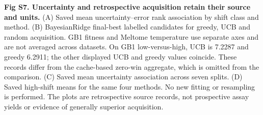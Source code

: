 \caption{{\bf Fig S7. Uncertainty and retrospective acquisition retain their source and units.} (A) Saved mean uncertainty--error rank association by shift class and method. (B) BayesianRidge final-best labelled candidates for greedy, UCB and random acquisition. GB1 fitness and Meltome temperature use separate axes and are not averaged across datasets. On GB1 low-versus-high, UCB is 7.2287 and greedy 6.2911; the other displayed UCB and greedy values coincide. These records differ from the cache-based zero-win aggregate, which is omitted from the comparison. (C) Saved mean uncertainty association across seven splits. (D) Saved high-shift means for the same four methods. No new fitting or resampling is performed. The plots are retrospective source records, not prospective assay yields or evidence of generally superior acquisition.}
